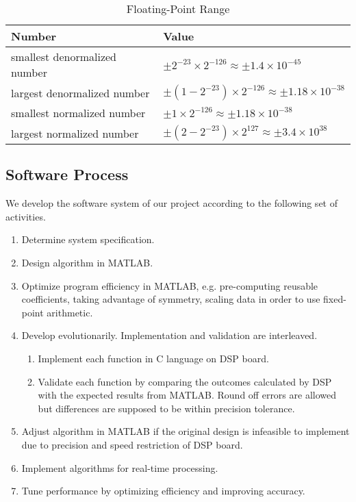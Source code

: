 \begin{table}[H]
\centering
\caption{Floating-Point Range}
\label{floating-point-range}
\begin{tabu} to \textwidth {XX}
\toprule
Number &Value\\
\hline
smallest denormalized number &$\pm 2^{-23} \times 2^{-126} \approx \pm 1.4 \times 10^{-45}$\\
\hline
largest denormalized number &$\pm (1-2^{-23}) \times 2^{-126} \approx \pm 1.18 \times 10^{-38}$\\
\hline
smallest normalized number &$\pm 1 \times 2^{-126} \approx \pm 1.18 \times 10^{-38}$\\
\hline
largest normalized number &$\pm (2-2^{-23}) \times 2^{127} \approx \pm 3.4 \times 10^{38}$\\
\bottomrule
\end{tabu}
\end{table}


\subsection{Software Process}

We develop the software system of our project according to the following set of activities.
\begin{enumerate}
\item Determine system specification.
\item Design algorithm in MATLAB.
\item Optimize program efficiency in MATLAB, e.g. pre-computing reusable coefficients, taking advantage of symmetry, scaling data in order to use fixed-point arithmetic.
\item Develop evolutionarily. Implementation and validation are interleaved.
\begin{enumerate}
	\item Implement each function in C language on DSP board.
	\item Validate each function by comparing the outcomes calculated by DSP with the expected results from MATLAB. Round off errors are allowed but differences are supposed to be within precision tolerance.
\end{enumerate}
\item Adjust algorithm in MATLAB if the original design is infeasible to implement due to precision and speed restriction of DSP board.
\item Implement algorithms for real-time processing.
\item Tune performance by optimizing efficiency and improving accuracy.
\end{enumerate}

